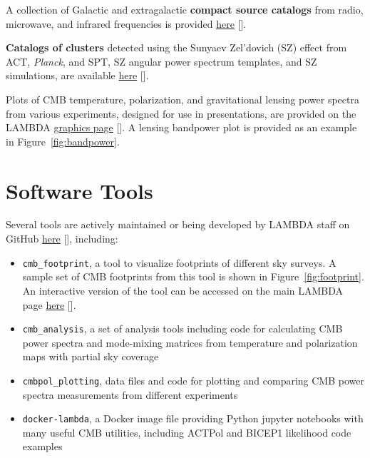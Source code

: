 \documentclass[twocolumn,tighten]{aastex631}
\newcommand{\planck}{\textsl{Planck}}
\begin{document}
A collection of Galactic and extragalactic {\bf compact source catalogs} from radio, microwave, and infrared frequencies is provided \href{https://lambda.gsfc.nasa.gov/product/foreground/fg_comp_source.cfm}{here} [].

{\bf Catalogs of clusters} detected using the Sunyaev Zel'dovich (SZ) effect from ACT,  \planck, and SPT, SZ angular power spectrum templates, and SZ simulations, are available \href{https://lambda.gsfc.nasa.gov/product/foreground/fg_sz_cluster.cfm}{here} [].

Plots of CMB temperature, polarization, and gravitational lensing power spectra from various experiments, designed for use in presentations, are provided on the LAMBDA  \href{https://lambda.gsfc.nasa.gov/graphics/}{graphics page} []. A lensing bandpower plot is provided as an example in Figure~\ref{fig:bandpower}.

\section{Software Tools}

Several tools are actively maintained or being developed by LAMBDA staff on GitHub \href{https://github.com/nasa-lambda}{here} [], including:
\begin{itemize}
\item \texttt{cmb\_footprint}, a tool to visualize footprints of different sky surveys. A sample set of CMB footprints from this tool is shown in Figure~\ref{fig:footprint}. An interactive version of the tool can be accessed on the main LAMBDA page \href{https://lambda.gsfc.nasa.gov/toolbox/footprint/aladin/}{here} [].
\item \texttt{cmb\_analysis}, a set of analysis tools including code for calculating CMB power spectra and mode-mixing matrices from temperature and polarization maps with partial sky coverage
\item \texttt{cmbpol\_plotting}, data files and code for plotting and comparing CMB power spectra measurements from different experiments
\item \texttt{docker-lambda}, a Docker image file providing Python jupyter notebooks with many useful CMB utilities, including ACTPol and BICEP1 likelihood code examples
\end{itemize}
\end{document}
